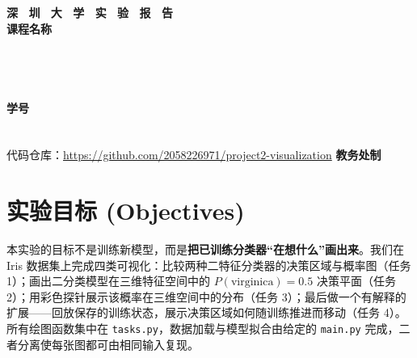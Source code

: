 \documentclass[a4paper,11pt]{article}
\begin{document}
\begin{titlepage}
\centering
\vspace*{2cm}
\Huge{\textbf{深 \ 圳 \ 大 \ 学 \ 实 \ 验 \ 报 \ 告}}\\[1.5cm]
{\Large\textbf{课程名称}\quad\underline{}}\\[0.5cm]
{\Large \noindent{} \underline{}}\\[0.5cm]
{\Large \noindent{} \underline{}}\\[0.5cm]
{\Large \noindent{} \underline{}}\\[0.5cm]
{\Large \noindent{} \underline{}}\\[0.5cm]
{\Large \noindent{} \underline{} \hspace{0.5cm} \textbf{学号} \underline{}}\\[0.5cm]
{\Large \noindent{} \underline{}}\\[0.5cm]
{\Large \noindent{} \underline{}}\\[1.2cm]
{\large 代码仓库：\url{https://github.com/2058226971/project2-visualization}}
\vfill
\Large{\textbf{教务处制}}
\end{titlepage}
\newpage


\section{实验目标 (Objectives)}
本实验的目标不是训练新模型，而是\textbf{把已训练分类器``在想什么''画出来}。我们在 Iris 数据集上完成四类可视化：比较两种二特征分类器的决策区域与概率图（任务 1）；画出二分类模型在三维特征空间中的 $P(\text{virginica})=0.5$ 决策平面（任务 2）；用彩色探针展示该概率在三维空间中的分布（任务 3）；最后做一个有解释的扩展——回放保存的训练状态，展示决策区域如何随训练推进而移动（任务 4）。所有绘图函数集中在 \texttt{tasks.py}，数据加载与模型拟合由给定的 \texttt{main.py} 完成，二者分离使每张图都可由相同输入复现。
\end{document}
